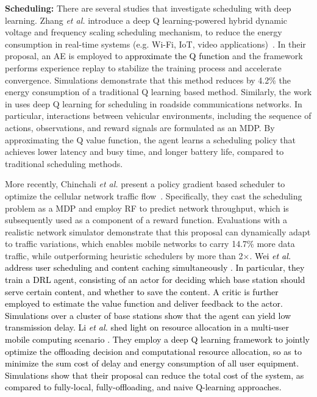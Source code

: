 \documentclass[journal,comsoc,letter]{IEEEtran}
\newcommand{\edit}[1]{\textcolor{black}{#1}}
\newcommand{\rev}[1]{\textcolor{black}{#1}}
\begin{document}
\noindent\textbf{Scheduling:} There are several studies that investigate scheduling with deep learning. Zhang \emph{et al.} introduce a deep Q learning-powered hybrid dynamic voltage and frequency scaling scheduling mechanism, to reduce the energy consumption in real-time systems (e.g. Wi-Fi, IoT, video applications)~\cite{zhang2017energy}. In their proposal, an AE is employed to \edit{approximate the Q function} and the framework performs experience replay \cite{schaul2015prioritized} to stabilize the training process and accelerate convergence. Simulations demonstrate that this method reduces by 4.2\% the energy consumption of a traditional Q learning based method. Similarly, the work in \cite{atallah2017deep} uses deep Q learning for scheduling in roadside communications networks. In particular, interactions between vehicular environments, including the sequence of actions, observations, and reward signals are formulated as an MDP. By approximating the Q value function, the agent learns a scheduling policy that achieves lower latency and busy time, and longer battery life, compared to traditional scheduling methods. 

More recently, Chinchali \emph{et al.} present a policy gradient based scheduler to optimize the cellular network traffic flow~\cite{chinchali2018}. Specifically, they cast the scheduling problem as a MDP and employ RF to predict network throughput, which is subsequently used as a component of a reward function. Evaluations with a realistic network simulator demonstrate that this proposal can dynamically adapt to traffic variations, which enables mobile networks to carry 14.7\% more data traffic, while outperforming heuristic schedulers by more than 2$\times$.  \edit{Wei \emph{et al.} address user scheduling and content caching simultaneously \cite{wei2018joint}. In particular, they train a DRL agent, consisting of an actor for deciding which base station should serve certain content, and whether to save the content. A critic is further employed to estimate the value function and deliver feedback to the actor. Simulations over a cluster of base stations show that the agent can yield low transmission delay.} \rev{Li \emph{et al.} shed light on resource allocation in a multi-user mobile computing scenario \cite{li2018deep}. They employ a deep Q learning framework to jointly optimize the offloading decision and computational resource  allocation, so as to minimize the sum cost of delay and energy consumption of all user equipment. Simulations show that their proposal can reduce the total cost of the system, as compared to fully-local, fully-offloading, and naive Q-learning approaches. }\\
\end{document}

